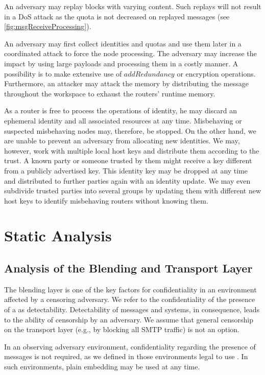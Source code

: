 An adversary may replay blocks with varying content. Such replays will not result in a DoS attack as the quota is not decreased on replayed messages (see \cref{fig:msgReceiveProcessing}).

An adversary may first collect identities and quotas and use them later in a coordinated attack to force the node processing. The adversary may increase the impact by using large payloads and processing them in a costly manner. A possibility is to make extensive use of $addRedundancy$ or encryption operations. Furthermore, an attacker may attack the memory by distributing the message throughout the workspace to exhaust the routers' runtime memory.

As a router is free to process the operations of identity, he may discard an ephemeral identity and all associated resources at any time. Misbehaving or suspected misbehaving nodes may, therefore, be stopped. On the other hand, we are unable to prevent an adversary from allocating new identities. We may, however, work with multiple local host keys and distribute them according to the trust. A known party or someone trusted by them might receive a key different from a publicly advertised key. This identity key may be dropped at any time and distributed to further parties again with an identity update. We may even subdivide trusted parties into several groups by updating them with different new host keys to identify misbehaving routers without knowing them. 

\chapter{Static Analysis}\label{sec:staticAnalysis}
\section{Analysis of the Blending and Transport Layer}\label{sec:analysisBlendingAndTransport}
The blending layer is one of the key factors for confidentiality in an environment affected by a censoring adversary. We refer to the confidentiality of the presence of a \VortexNode{} as detectability. Detectability of messages and systems, in consequence, leads to the ability of censorship by an adversary. We assume that general censorship on the transport layer (e.g., by blocking all SMTP traffic) is not an option.

In an observing adversary environment, confidentiality regarding the presence of messages is not required, as we defined in those environments legal to use \MessageVortex. In such environments, plain embedding may be used at any time.

